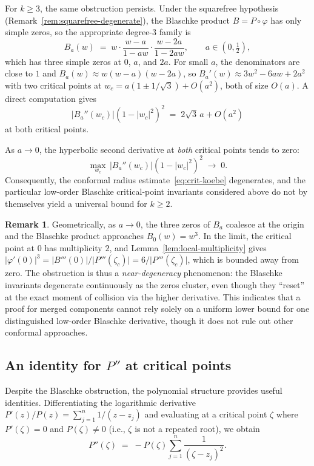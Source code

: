 \documentclass[11pt,a4paper]{amsart}
\theoremstyle{definition}
\newtheorem{remark}[theorem]{Remark}
\newcommand{\abs}[1]{\lvert #1 \rvert}
\begin{document}
For $k \geq 3$, the same obstruction persists.
Under the squarefree hypothesis (Remark~\ref{rem:squarefree-degenerate}),
the Blaschke product $B = P \circ \varphi$ has only simple zeros,
so the appropriate degree-$3$ family is
\[
  B_{a}(w) \;=\; w \cdot \frac{w - a}{1 - aw}
  \cdot \frac{w - 2a}{1 - 2aw}, \qquad a \in (0, \tfrac{1}{2}),
\]
which has three simple zeros at $0$, $a$, and $2a$.
For small $a$, the denominators are close to $1$ and
$B_a(w) \approx w(w-a)(w-2a)$, so
$B_a'(w) \approx 3w^2 - 6aw + 2a^2$
with two critical points at $w_c = a(1 \pm 1/\sqrt{3}) + O(a^2)$,
both of size $O(a)$.  A direct computation gives
\[
  \abs{B_a''(w_c)}(1-\abs{w_c}^2)^2 \;=\; 2\sqrt{3}\,a + O(a^2)
\]
at both critical points.

As $a \to 0$, the hyperbolic second derivative at \emph{both}
critical points tends to zero:
\[
  \max_{w_c}\, \abs{B_a''(w_c)}(1-\abs{w_c}^2)^2 \;\to\; 0.
\]
Consequently, the conformal radius estimate~\eqref{eq:crit-koebe}
degenerates, and the particular low-order Blaschke critical-point
invariants considered above do not by themselves yield a universal
bound for $k \geq 2$.

\begin{remark}
Geometrically, as $a \to 0$, the three zeros of $B_a$ coalesce at
the origin and the Blaschke product approaches $B_0(w) = w^3$.
In the limit, the critical point at $0$ has multiplicity $2$,
and Lemma~\ref{lem:local-multiplicity}
gives $\abs{\varphi'(0)}^3 = \abs{B'''(0)}/\abs{P'''(\zeta_c)} = 6/\abs{P'''(\zeta_c)}$,
which is bounded away from zero.  The obstruction is thus a
\emph{near-degeneracy} phenomenon: the Blaschke invariants degenerate
continuously as the zeros cluster, even though they
``reset'' at the exact moment of collision via the higher derivative.
This indicates that a proof for merged components cannot rely solely
on a uniform lower bound for one distinguished low-order Blaschke
derivative, though it does not rule out other conformal approaches.
\end{remark}

\subsection{An identity for $P''$ at critical points}

Despite the Blaschke obstruction, the polynomial structure provides
useful identities.  Differentiating the logarithmic derivative
$P'(z)/P(z) = \sum_{j=1}^n 1/(z-z_j)$ and evaluating at a critical
point $\zeta$ where $P'(\zeta) = 0$ and $P(\zeta) \neq 0$
(i.e., $\zeta$ is not a repeated root), we obtain
\begin{equation}\label{eq:Ppp-identity}
  P''(\zeta) \;=\; -P(\zeta) \sum_{j=1}^n \frac{1}{(\zeta - z_j)^2}.
\end{equation}
\end{document}
